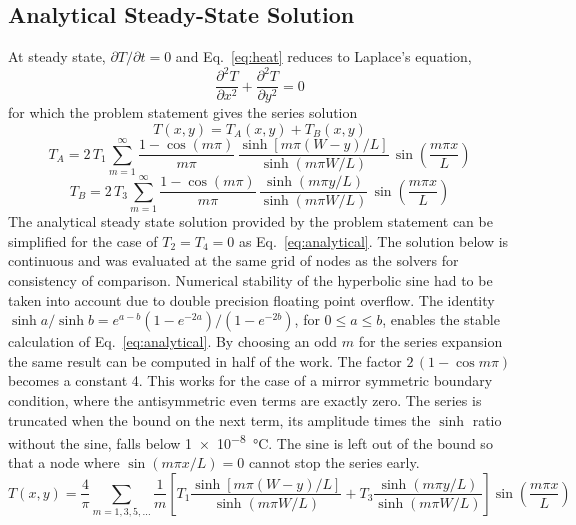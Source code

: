\documentclass[conf]{new-aiaa}
\begin{document}
\subsection{Analytical Steady-State Solution}
At steady state, $\partial T/\partial t = 0$ and Eq.~\eqref{eq:heat} reduces to Laplace's equation,
\begin{equation}
  \frac{\partial^2 T}{\partial x^2} + \frac{\partial^2 T}{\partial y^2} = 0
  \label{eq:laplace}
\end{equation}
for which the problem statement gives the series solution
\begin{equation}
  T(x, y) = T_A(x, y) + T_B(x, y)
  \label{eq:exact}
\end{equation}
\begin{equation}
  T_A = 2\,T_1 \sum_{m=1}^{\infty}
        \frac{1 - \cos(m\pi)}{m\pi}\,
        \frac{\sinh\!\left[ m\pi (W - y)/L \right]}{\sinh\!\left( m\pi W/L \right)}\,
        \sin\!\left( \frac{m\pi x}{L} \right)
  \label{eq:TA}
\end{equation}
\begin{equation}
  T_B = 2\,T_3 \sum_{m=1}^{\infty}
        \frac{1 - \cos(m\pi)}{m\pi}\,
        \frac{\sinh\!\left( m\pi y/L \right)}{\sinh\!\left( m\pi W/L \right)}\,
        \sin\!\left( \frac{m\pi x}{L} \right)
  \label{eq:TB}
\end{equation}
The analytical steady state solution provided by the problem statement can be simplified for the case of $T_2 = T_4 = 0$ as Eq.~\eqref{eq:analytical}.
The solution below is continuous and was evaluated at the same grid of nodes as the solvers for consistency of comparison.
Numerical stability of the hyperbolic sine had to be taken into account due to double precision floating point overflow.
The identity $\sinh a / \sinh b = e^{a-b} (1 - e^{-2a}) / (1 - e^{-2b})$, for $0 \le a \le b$, enables the stable calculation of Eq.~\eqref{eq:analytical}.
By choosing an odd $m$ for the series expansion the same result can be computed in half of the work. The factor 
$2\,(1 - \cos m\pi)$ 
becomes a constant 4. This works for the case of a mirror symmetric boundary condition, where the antisymmetric even terms are exactly zero. 
The series is truncated when the bound on the next term, its amplitude times the $\sinh$ ratio without the sine,
falls below \SI{1e-8}{\degreeCelsius}. The sine is left out of the bound so that a node where $\sin(m\pi x/L) = 0$
cannot stop the series early.
\begin{equation}
  T(x, y) = \frac{4}{\pi} \sum_{m = 1,3,5,\dots}
  \frac{1}{m}
  \left[ T_1 \frac{\sinh\!\left[ m\pi (W - y)/L \right]}{\sinh(m\pi W/L)}
       + T_3 \frac{\sinh(m\pi y/L)}{\sinh(m\pi W/L)} \right]
  \sin\!\left( \frac{m\pi x}{L} \right)
  \label{eq:analytical}
\end{equation}
\end{document}
